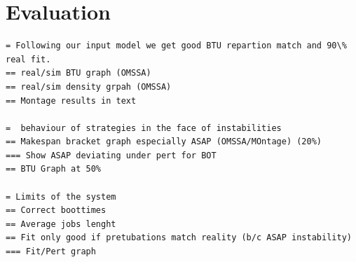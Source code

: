 \documentclass[10pt,conference,compsocconf]{IEEEtran}
\begin{document}
\section{Evaluation}
\label{sec:eval}

\begin{verbatim}
= Following our input model we get good BTU repartion match and 90\% real fit.
== real/sim BTU graph (OMSSA)
== real/sim density grpah (OMSSA)
== Montage results in text

=  behaviour of strategies in the face of instabilities
== Makespan bracket graph especially ASAP (OMSSA/MOntage) (20%)
=== Show ASAP deviating under pert for BOT
== BTU Graph at 50%

= Limits of the system
== Correct boottimes
== Average jobs lenght
== Fit only good if pretubations match reality (b/c ASAP instability)
=== Fit/Pert graph

\end{verbatim}
\end{document}
